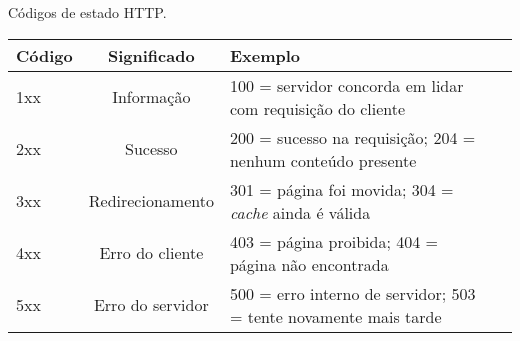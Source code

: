 \begin{quadro}[!htb]
	\centering
	\caption{Códigos de estado HTTP.\label{qua:estadoshttp}}
	\begin{tabular}{| m{1.5cm} | Sm{3.5cm} | m{8.5cm} |}
		\hline
		\textbf{Código} & \textbf{Significado} & \textbf{Exemplo}                            \\
		\hline
		1xx             & Informação           & 100 = servidor concorda em lidar com requisição do cliente       \\
		\hline
		2xx             & Sucesso              & 200 = sucesso na requisição; 204 = nenhum conteúdo presente      \\
		\hline
		3xx             & Redirecionamento     & 301 = página foi movida; 304 = \textit{cache} ainda é válida       \\
		\hline
		4xx             & Erro do cliente      & 403 = página proibida; 404 = página não encontrada               \\
		\hline
		5xx             & Erro do servidor     & 500 = erro interno de servidor; 503 = tente novamente mais tarde \\
		\hline
	\end{tabular}
\end{quadro}